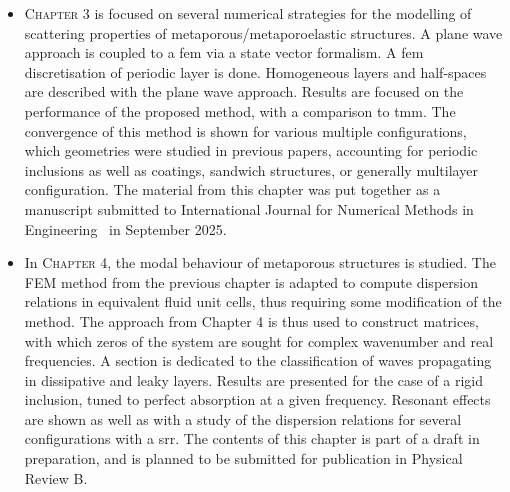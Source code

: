 \begin{itemize}
    \item \textsc{Chapter} 3 is focused on several numerical strategies for the modelling of scattering properties of metaporous/metaporoelastic structures. A plane wave approach is coupled to a \acrshort{fem} via a state vector formalism. A \acrshort{fem} discretisation of periodic layer is done. Homogeneous layers and half-spaces are described with the plane wave approach. Results are focused on the performance of the proposed method, with a comparison to \acrshort{tmm}. The convergence of this method is shown for various multiple configurations, which geometries were studied in previous papers, accounting for periodic inclusions as well as coatings, sandwich structures, or generally multilayer configuration. The material from this chapter was put together as a manuscript submitted to International Journal for Numerical Methods in Engineering~\cite{marechal_ijnme_sub} in September 2025.\\[3em]

    \item In \textsc{Chapter} 4, the modal behaviour of metaporous structures is studied. The FEM method from the previous chapter is adapted to compute dispersion relations in equivalent fluid unit cells, thus requiring some modification of the method. The approach from Chapter 4 is thus used to construct matrices, with which zeros of the system are sought for complex wavenumber and real frequencies. A section is dedicated to the classification of waves propagating in dissipative and leaky layers. Results are presented for the case of a rigid inclusion, tuned to perfect absorption at a given frequency. Resonant effects are shown as well as with a study of the dispersion relations for several configurations with a \acrfull{srr}. The contents of this chapter is part of a draft in preparation, and is planned to be submitted for publication in Physical Review B. 
\end{itemize}
\endgroup